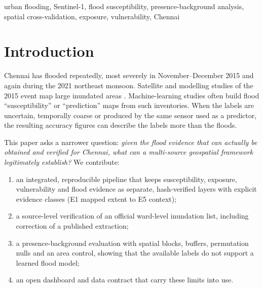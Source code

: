 \documentclass[conference]{IEEEtran}
\begin{document}
\begin{IEEEkeywords}
urban flooding, Sentinel-1, flood susceptibility, presence-background analysis, spatial cross-validation, exposure, vulnerability, Chennai
\end{IEEEkeywords}

\section{Introduction}
Chennai has flooded repeatedly, most severely in November--December 2015 and again during the 2021 northeast monsoon. Satellite and modelling studies of the 2015 event map large inundated areas \cite{ramasamy2018chennai,chundeli2018chennai,iwmi2015chennai}. Machine-learning studies often build flood ``susceptibility'' or ``prediction'' maps from such inventories. When the labels are uncertain, temporally coarse or produced by the same sensor used as a predictor, the resulting accuracy figures can describe the labels more than the floods.

This paper asks a narrower question: \emph{given the flood evidence that can actually be obtained and verified for Chennai, what can a multi-source geospatial framework legitimately establish?} We contribute:
\begin{enumerate}
\item an integrated, reproducible pipeline that keeps susceptibility, exposure, vulnerability and flood evidence as separate, hash-verified layers with explicit evidence classes (E1 mapped extent to E5 context);
\item a source-level verification of an official ward-level inundation list, including correction of a published extraction;
\item a presence-background evaluation with spatial blocks, buffers, permutation nulls and an area control, showing that the available labels do not support a learned flood model;
\item an open dashboard and data contract that carry these limits into use.
\end{enumerate}
\end{document}
